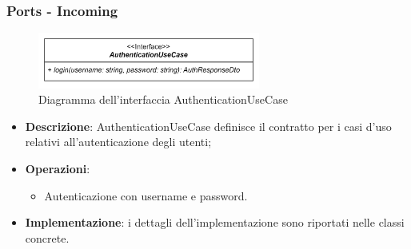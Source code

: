 \subsubsection{Ports - Incoming}

 \label{AuthenticationUseCase}
\begin{figure}[H]
    \centering
    \includegraphics[width=0.65\textwidth]{assets/Backend/authentication_use_case.png}
    \caption{Diagramma dell'interfaccia AuthenticationUseCase}
  \end{figure}
\begin{itemize}
    \item \textbf{Descrizione}: AuthenticationUseCase definisce il contratto per i casi d'uso relativi all'autenticazione degli utenti;
    \item \textbf{Operazioni}:
    \begin{itemize}
        \item Autenticazione con username e password.
    \end{itemize}
    \item \textbf{Implementazione}: i dettagli dell'implementazione sono riportati nelle classi concrete.
\end{itemize}  

